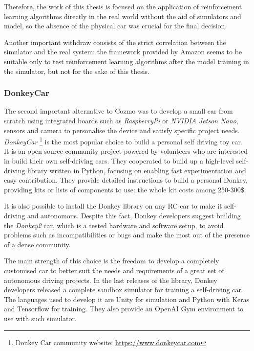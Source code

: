 Therefore, the work of this thesis is focused on the application of reinforcement learning algorithms directly in the real world without the aid of simulators and model, so the absence of the physical car was crucial for the final decision.

Another important withdraw consists of the strict correlation between the simulator and the real system: the framework provided by Amazon seems to be suitable only to test reinforcement learning algorithms after the model training in the simulator, but not for the sake of this thesis.

\subsubsection{Donkey\textregistered Car} 

The second important alternative to Cozmo was to develop a small car from scratch using integrated boards such as \textit{RaspberryPi} or \textit{NVIDIA Jetson Nano}, sensors and camera to personalise the device and satisfy specific project needs.
\textit{Donkey\textregistered Car} \footnote{Donkey Car community website: \href{https://www.donkeycar.com}{https://www.donkeycar.com}} is the most popular choice to build a personal self driving toy car. It is an open-source community project powered by volunteers who are interested in build their own self-driving cars. They cooperated to build up a high-level self-driving library written in Python, focusing on enabling fast experimentation and easy contribution. They provide detailed instructions to build a personal Donkey, providing kits or lists of components to use: the whole kit costs among 250-300\$.

It is also possible to install the Donkey library on any RC car to make it self-driving and autonomous. Despite this fact, Donkey developers suggest building the \textit{Donkey2} car, which is a tested hardware and software setup, to avoid problems such as incompatibilities or bugs and make the most out of the presence of a dense community.

The main strength of this choice is the freedom to develop a completely customised car to better suit the needs and requirements of a great set of autonomous driving projects. In the last releases of the library, Donkey developers released a complete sandbox simulator for training a self-driving car. The languages used to develop it are Unity for simulation and Python with Keras and Tensorflow for training. They also provide an OpenAI Gym environment to use with such simulator.

